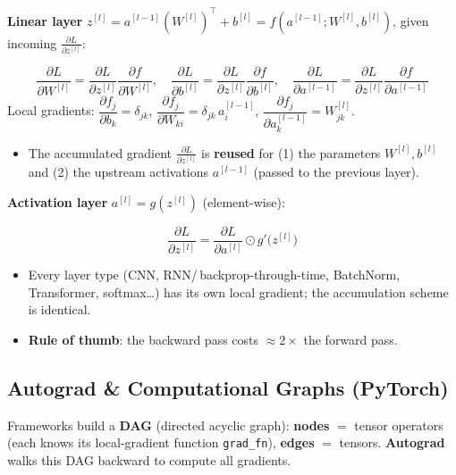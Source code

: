 \documentclass[10pt,a4paper]{article}
\begin{document}
	\textbf{Linear layer} $z^{[l]} = a^{[l-1]}(W^{[l]})^{\top}+b^{[l]} = f(a^{[l-1]};W^{[l]},b^{[l]})$, given incoming $\frac{\partial L}{\partial z^{[l]}}$:
	\begin{formulabox}
		\[
		\frac{\partial L}{\partial W^{[l]}} = \frac{\partial L}{\partial z^{[l]}}\frac{\partial f}{\partial W^{[l]}}, \quad
		\frac{\partial L}{\partial b^{[l]}} = \frac{\partial L}{\partial z^{[l]}}\frac{\partial f}{\partial b^{[l]}}, \quad
		\frac{\partial L}{\partial a^{[l-1]}} = \frac{\partial L}{\partial z^{[l]}}\frac{\partial f}{\partial a^{[l-1]}}
		\]
		Local gradients: $\dfrac{\partial f_j}{\partial b_k}=\delta_{jk}$, \quad $\dfrac{\partial f_j}{\partial W_{ki}}=\delta_{jk}\,a_i^{[l-1]}$, \quad $\dfrac{\partial f_j}{\partial a_k^{[l-1]}}=W_{jk}^{[l]}$.
	\end{formulabox}
	\begin{itemize}[leftmargin=*]
		\item The accumulated gradient $\frac{\partial L}{\partial z^{[l]}}$ is \textbf{reused} for (1) the parameters $W^{[l]},b^{[l]}$ and (2) the upstream activations $a^{[l-1]}$ (passed to the previous layer).
	\end{itemize}

	\textbf{Activation layer} $a^{[l]} = g(z^{[l]})$ (element-wise):
	\begin{formulabox}
		\[
		\frac{\partial L}{\partial z^{[l]}} = \frac{\partial L}{\partial a^{[l]}} \odot g'\!\big(z^{[l]}\big)
		\]
	\end{formulabox}
	\begin{itemize}[leftmargin=*]
		\item Every layer type (CNN, RNN/\,backprop-through-time, BatchNorm, Transformer, softmax\ldots) has its own local gradient; the accumulation scheme is identical.
		\item \textbf{Rule of thumb}: the backward pass costs $\approx 2\times$ the forward pass.
	\end{itemize}

	\subsection{Autograd \& Computational Graphs (PyTorch)}

	\begin{definitionbox}
		Frameworks build a \textbf{DAG} (directed acyclic graph): \textbf{nodes} $=$ tensor operators (each knows its local-gradient function \texttt{grad\_fn}), \textbf{edges} $=$ tensors. \textbf{Autograd} walks this DAG backward to compute all gradients.
	\end{definitionbox}
\end{document}
